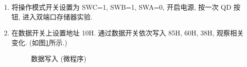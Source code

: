\documentclass[../main.tex]{subfiles}
\begin{document}
\begin{enumerate}

    \item 将操作模式开关设置为 SWC=1, SWB=1, SWA=0, 开启电源, 按一次 QD 按钮, 进入双端口存储器实验.

    \item 在数据开关上设置地址 10H. 通过数据开关依次写入 85H, 60H, 38H, 观察相关变化. (如图\ref{fig:2.1}所示.)

          \begin{figure}[p]
              \centering
              \caption{数据写入 (微程序)}
              \label{fig:2.1}
          \end{figure}


\end{enumerate}
\end{document}
